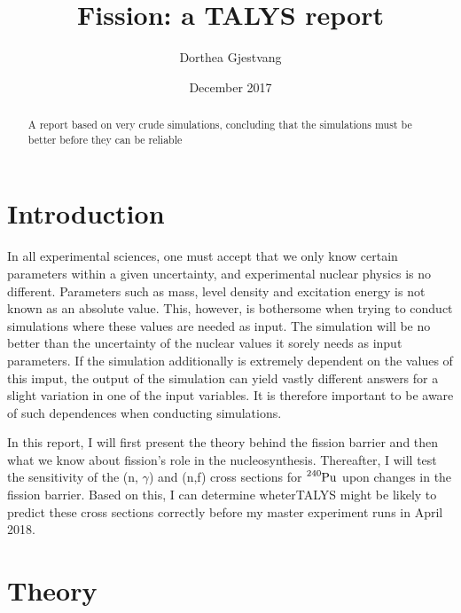 \documentclass[]{article}
\title{}
\author{}
\begin{document}
	
\title{Fission: a TALYS report}
\author{Dorthea Gjestvang }
\date{December 2017}

\maketitle

\begin{abstract}
A report based on very crude simulations, concluding that the simulations must be better before they can be reliable
\end{abstract}

\section{Introduction}

In all experimental sciences, one must accept that we only know certain parameters within a given uncertainty, and experimental nuclear physics is no different. Parameters such as mass, level density and excitation energy is not known as an absolute value. This, however, is bothersome when trying to conduct simulations where these values are needed as input. The simulation will be no better than the uncertainty of the nuclear values it sorely needs as input parameters. If the simulation additionally is extremely dependent on the values of this imput, the output of the simulation can yield vastly different answers for a slight variation in one of the input variables. It is therefore important to be aware of such dependences when conducting simulations. 

\par 
\vspace{3mm}

In this report, I will first present the theory behind the fission barrier and then what we know about fission's role in the nucleosynthesis. Thereafter, I will test the sensitivity of the (n, $\gamma$) and (n,f) cross sections for $\ce{^{240}Pu}$ upon changes in the fission barrier. Based on this, I can determine wheterTALYS might be likely to predict these cross sections correctly before my master experiment runs in April 2018.

\section{Theory}
\label{Theory}
\end{document}
